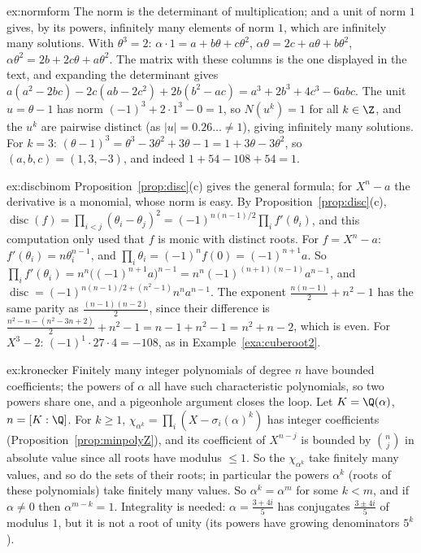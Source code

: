 \begin{solution}{ex:normform}
\idea The norm is the determinant of multiplication; and a unit of norm $1$ gives, by its powers, infinitely many
elements of norm $1$, which are infinitely many solutions.
\writeup With $\theta^3=2$: $\alpha\cdot1=a+b\theta+c\theta^2$, $\alpha\theta=2c+a\theta+b\theta^2$,
$\alpha\theta^2=2b+2c\theta+a\theta^2$. The matrix with these columns is the one displayed in the text, and expanding
the determinant gives $a(a^2-2bc)-2c(ab-2c^2)+2b(b^2-ac)=a^3+2b^3+4c^3-6abc$. The unit $u=\theta-1$ has norm
$(-1)^3+2\cdot1^3-0=1$, so $N(u^k)=1$ for all $k\in\Z$, and the $u^k$ are pairwise distinct (as $|u|=0.26\ldots\ne1$),
giving infinitely many solutions. For $k=3$: $(\theta-1)^3=\theta^3-3\theta^2+3\theta-1=1+3\theta-3\theta^2$, so
$(a,b,c)=(1,3,-3)$, and indeed $1+54-108+54=1$.
\end{solution}

\begin{solution}{ex:discbinom}
\idea Proposition~\ref{prop:disc}(c) gives the general formula; for $X^n-a$ the derivative is a monomial, whose norm is
easy.
\writeup By Proposition~\ref{prop:disc}(c), $\operatorname{disc}(f)=\prod_{i<j}(\theta_i-\theta_j)^2=(-1)^{n(n-1)/2}
\prod_if'(\theta_i)$, and this computation only used that $f$ is monic with distinct roots. For $f=X^n-a$:
$f'(\theta_i)=n\theta_i^{n-1}$, and $\prod_i\theta_i=(-1)^nf(0)=(-1)^{n+1}a$. So
$\prod_if'(\theta_i)=n^n\bigl((-1)^{n+1}a\bigr)^{n-1}=n^n(-1)^{(n+1)(n-1)}a^{n-1}$, and
$\operatorname{disc}=(-1)^{n(n-1)/2+(n^2-1)}n^na^{n-1}$. The exponent $\frac{n(n-1)}2+n^2-1$ has the same parity as
$\frac{(n-1)(n-2)}2$, since their difference is $\frac{n^2-n-(n^2-3n+2)}2+n^2-1=n-1+n^2-1=n^2+n-2$, which is even. For
$X^3-2$: $(-1)^1\cdot27\cdot4=-108$, as in Example~\ref{exa:cuberoot2}.
\end{solution}

\begin{solution}{ex:kronecker}
\idea Finitely many integer polynomials of degree $n$ have bounded coefficients; the powers of $\alpha$ all have such
characteristic polynomials, so two powers share one, and a pigeonhole argument closes the loop.
\writeup Let $K=\Q(\alpha)$, $n=[K:\Q]$. For $k\ge1$, $\chi_{\alpha^k}=\prod_i(X-\sigma_i(\alpha)^k)$ has integer
coefficients (Proposition~\ref{prop:minpolyZ}), and its coefficient of $X^{n-j}$ is bounded by $\binom nj$ in absolute
value since all roots have modulus $\le1$. So the $\chi_{\alpha^k}$ take finitely many values, and so do the sets of
their roots; in particular the powers $\alpha^k$ (roots of these polynomials) take finitely many values. So
$\alpha^k=\alpha^m$ for some $k<m$, and if $\alpha\ne0$ then $\alpha^{m-k}=1$. Integrality is needed: $\alpha=
\frac{3+4i}5$ has conjugates $\frac{3\pm4i}5$ of modulus $1$, but it is not a root of unity (its powers have growing
denominators $5^k$).
\end{solution}

